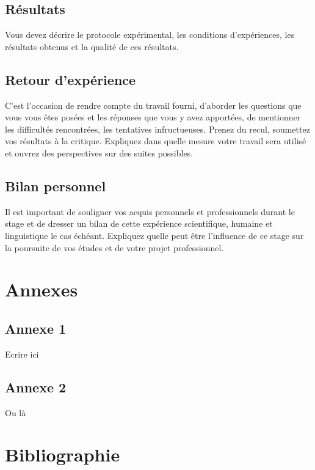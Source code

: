 \documentclass[twoside,10pt,openany,a4paper]{rapport}
\begin{document}
  \chapter{Résultats}
  Vous devez décrire le protocole expérimental, les conditions d’expériences, les résultats obtenus et la qualité de ces résultats.

  \chapter{Retour d'expérience}
  C’est l’occasion de rendre compte du travail fourni, d’aborder les questions que vous vous êtes posées et les réponses que vous y avez apportées, de mentionner les difficultés rencontrées, les tentatives infructueuses. Prenez du recul, soumettez vos résultats à la critique. Expliquez dans quelle mesure votre travail sera utilisé et ouvrez des perspectives sur des suites possibles.

  \chapter{Bilan personnel}
  Il est important de souligner vos acquis personnels et professionnels durant le stage et de  dresser un bilan de cette expérience scientifique, humaine et linguistique le cas échéant. Expliquez quelle peut être l’influence de ce stage sur la poursuite de vos études et de votre projet professionnel.

  \backmatter

  \appendix
  \part{Annexes}
  \chapter{Annexe 1}
  Ecrire ici

  \chapter{Annexe 2}
  Ou là

  \part{Bibliographie}

  \nocite{Merchet2007}
  \nocite{Goossens1993}
  \nocite{Greenwade1993}

  
  
\end{document}
